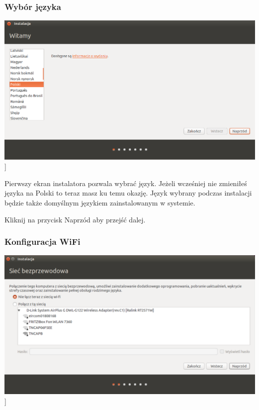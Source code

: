 \subsubsection{Wybór języka}
\begin{center}
        \includegraphics[width=\linewidth]{images/instalator_jezyk.png}]
\end{center}

Pierwszy ekran instalatora pozwala wybrać język. Jeżeli wcześniej nie zmieniłeś języka na Polski to teraz masz ku temu okazję. Język wybrany podczas instalacji będzie także domyślnym językiem zainstalowanym w systemie.
\begin{flushright}
Kliknij na przycisk \textcolor{ubuntu_orange}{Naprzód} aby przejść dalej.
\end{flushright}
\clearpage
\subsubsection{Konfiguracja WiFi}
\begin{center}
        \includegraphics[width=\linewidth]{images/instalator_wifi.png}]
\end{center}


